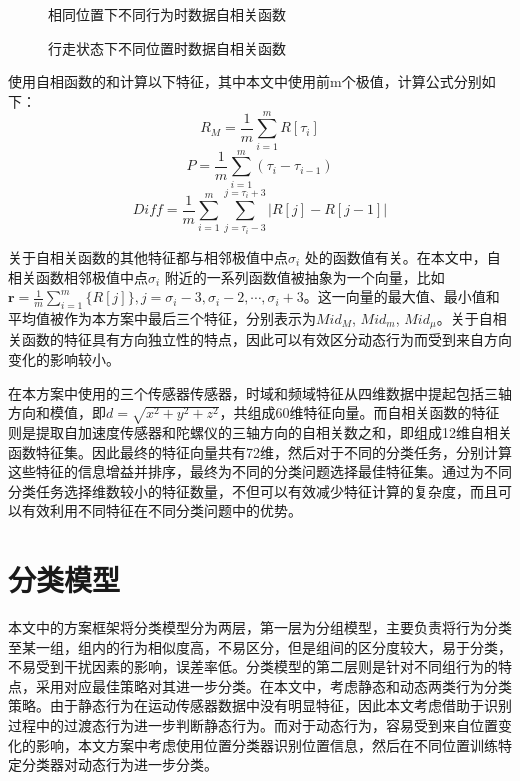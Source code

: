 \begin{figure}[!htb]
    \centering
    \caption{相同位置下不同行为时数据自相关函数}
\end{figure}

\begin{figure}[!htb]
    \centering
    \caption{行走状态下不同位置时数据自相关函数}
\end{figure}

\par 使用自相函数的和计算以下特征，其中本文中使用前m个极值，计算公式分别如下：
\begin{equation}
    R_M = \frac {1}{m}\sum_{i=1}^m R[\tau_i]
\end{equation}
\begin{equation}
    P = \frac{1}{m}\sum_{i=1}^m {(\tau_i-\tau_{i-1})}
\end{equation}
\begin{equation}
    Diff = \frac{1}{m}\sum_{i=1}^m \sum_{j=\tau_i-3}^{j=\tau_i+3} {|R[j]-R[j-1]|} 
\end{equation}
\par 关于自相关函数的其他特征都与相邻极值中点$\sigma_i$ 处的函数值有关。在本文中，自相关函数相邻极值中点$\sigma_i$ 附近的一系列函数值被抽象为一个向量，比如 $\textbf{r}=\frac {1}{m} \sum_{i=1}^m\{R[j]\}, j=\sigma_i-3, \sigma_i-2,\cdots,\sigma_i+3$。这一向量的最大值、最小值和平均值被作为本方案中最后三个特征，分别表示为$Mid_M$, $Mid_m$, $Mid_\mu$。关于自相关函数的特征具有方向独立性的特点，因此可以有效区分动态行为而受到来自方向变化的影响较小。
\par 在本方案中使用的三个传感器传感器，时域和频域特征从四维数据中提起包括三轴方向和模值，即$d=\sqrt{x^2+y^2+z^2}$，共组成60维特征向量。而自相关函数的特征则是提取自加速度传感器和陀螺仪的三轴方向的自相关数之和，即组成12维自相关函数特征集。因此最终的特征向量共有72维，然后对于不同的分类任务，分别计算这些特征的信息增益并排序，最终为不同的分类问题选择最佳特征集。通过为不同分类任务选择维数较小的特征数量，不但可以有效减少特征计算的复杂度，而且可以有效利用不同特征在不同分类问题中的优势。

\section{分类模型}
\par 本文中的方案框架将分类模型分为两层，第一层为分组模型，主要负责将行为分类至某一组，组内的行为相似度高，不易区分，但是组间的区分度较大，易于分类，不易受到干扰因素的影响，误差率低\cite{ustev2013user}。分类模型的第二层则是针对不同组行为的特点，采用对应最佳策略对其进一步分类。在本文中，考虑静态和动态两类行为分类策略。由于静态行为在运动传感器数据中没有明显特征，因此本文考虑借助于识别过程中的过渡态行为进一步判断静态行为。而对于动态行为，容易受到来自位置变化的影响，本文方案中考虑使用位置分类器识别位置信息，然后在不同位置训练特定分类器对动态行为进一步分类。

